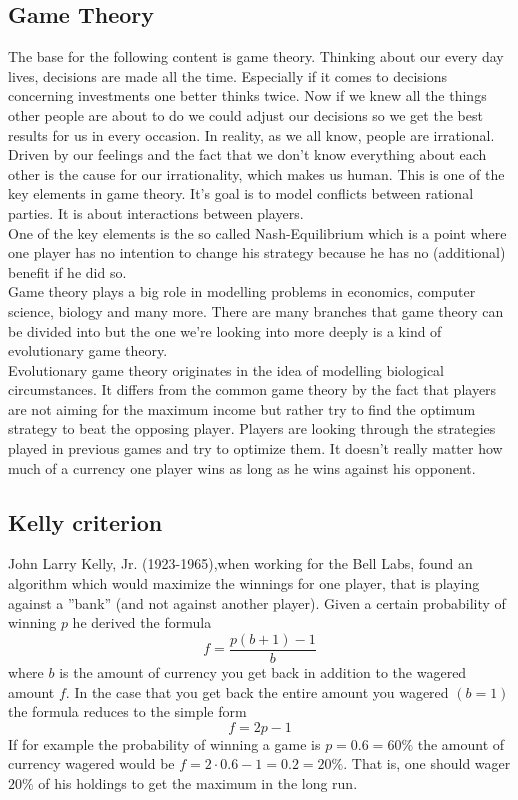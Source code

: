 \documentclass[11pt]{article}
\begin{document}
\subsection{Game Theory}
The base for the following content is game theory. Thinking about our every day lives, decisions are made all the time. Especially if it comes to decisions concerning investments one better thinks twice. Now if we knew all the things other people are about to do we could adjust our decisions so we get the best results for us in every occasion. In reality, as we all know, people are irrational. Driven by our feelings and the fact that we don't know everything about each other is the cause for our irrationality, which makes us human. This is one of the key elements in game theory. It's goal is to model conflicts between rational parties.  It is about interactions between players. \\
One of the key elements is the so called Nash-Equilibrium which is a point where one player has no intention to change his strategy because he has no (additional) benefit if he did so. \\
Game theory plays a big role in modelling problems in economics, computer science, biology and many more. There are many branches that game theory can be divided into but the one we're looking into more deeply is a kind of evolutionary game theory. \\
Evolutionary game theory originates in the idea of modelling biological circumstances. It differs from the common game theory by the fact that players are not aiming for the maximum income but rather try to find the optimum strategy to beat the opposing player. Players are looking through the strategies played in previous games and try to optimize them. It doesn't really matter how much of a currency one player wins as long as he wins against his opponent.
 
\subsection{Kelly criterion}
John Larry Kelly, Jr. (1923-1965),when working for the Bell Labs, found an algorithm which would maximize the winnings for one player, that is playing against a ''bank'' (and not against another player). Given a certain probability of winning $p$ he derived the formula
$$f=\frac{p(b+1)-1}{b}$$
where $b$ is the amount of currency you get back in addition to the wagered amount $f$. In the case that you get back the entire amount you wagered $(b=1)$ the formula reduces to the simple form
$$f=2p-1$$
If for example the probability of winning a game is $p=0.6=60\%$ the amount of currency wagered would be $f=2\cdot0.6-1=0.2=20\%$. That is, one should wager $20\%$ of his holdings to get the maximum in the long run.
\end{document}
